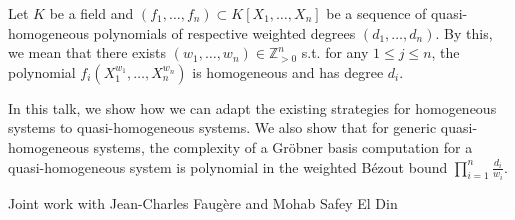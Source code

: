 \documentclass[10pt,a4paper]{scrartcl}
\begin{document}
Let $K$ be a field and $(f_1, \ldots, f_n)\subset K[X_1, \ldots, X_n]$ be a sequence of quasi-homogeneous polynomials of respective weighted degrees $(d_1, \ldots, d_n)$.  By this, we mean that there exists $(w_{1},\dots,w_{n}) \in \mathbb{Z}_{>0}^{n}$ s.t. for any $1 \leq j \leq n$, the polynomial $f_{i}(X_{1}^{w_{1}},\dots,X_{n}^{w_{n}})$ is homogeneous and has degree $d_{i}$.

In this talk, we show how we can adapt the existing strategies for homogeneous systems to quasi-homogeneous systems. We also show that for generic quasi-homogeneous systems, the complexity of a Gröbner basis computation for a quasi-homogeneous system is polynomial in the weighted Bézout bound $\prod_{i=1}^n\frac{d_i}{w_i}$.

Joint work with Jean-Charles Faugère and Mohab Safey El Din
\end{document}
